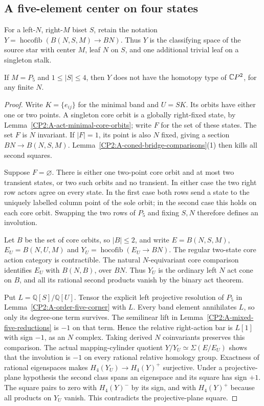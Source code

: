 \subsection{A five-element center on four states}

For a left-$N$, right-$M$ biset $S$, retain the notation
$Y=\operatorname{hocofib}(B(N,S,M)\to BN)$.  Thus $Y$ is
the classifying space of the source star with center $M$,
leaf $N$ on $S$, and one additional trivial leaf on a
singleton stalk.

\begin{lemma}
\label{CP2:A-coned-four-center-P5}
If $M=P_5$ and $1\le |S|\le4$, then $Y$ does not have
the homotopy type of $\mathbb{C}P^2$, for any finite $N$.
\end{lemma}
\begin{proof}
Write $K=\{e_{ij}\}$ for the minimal band and $U=SK$.
Its orbits have either one or two points.  A singleton
core orbit is a globally right-fixed state, by
Lemma~\ref{CP2:A-act-minimal-core-orbits}; write $F$ for
the set of these states.  The set $F$ is $N$ invariant.
If $|F|=1$, its point is also $N$ fixed, giving a section
$BN\to B(N,S,M)$.  Lemma~\ref{CP2:A-coned-bridge-comparisons}(1)
then kills all second squares.

Suppose $F=\varnothing$.  There is either one two-point
core orbit and at most two transient states, or two such
orbits and no transient.  In either case the two right
row actors agree on every state.  In the first case both
rows send a state to the uniquely labelled column point
of the sole orbit; in the second case this holds on each
core orbit.  Swapping the two rows of $P_5$ and fixing
$S,N$ therefore defines an involution.

Let $B$ be the set of core orbits, so $|B|\le2$, and
write $E=B(N,S,M)$, $E_U=B(N,U,M)$ and
$Y_U=\operatorname{hocofib}(E_U\to BN)$.  The regular
two-state core action category is contractible.  The
natural $N$-equivariant core comparison identifies $E_U$
with $B(N,B)$, over $BN$.  Thus $Y_U$ is the ordinary
left $N$ act cone on $B$, and all its rational second
products vanish by the binary act theorem.

Put $L=\mathbb Q[S]/\mathbb Q[U]$.  Tensor the explicit
left projective resolution of $P_5$ in
Lemma~\ref{CP2:A-order-five-corner} with $L$.  Every band
element annihilates $L$, so only its degree-one term
survives.  The semilinear lift in
Lemma~\ref{CP2:A-mixed-five-reductions} is $-1$ on that
term.  Hence the relative right-action bar is $L[1]$
with sign $-1$, as an $N$ complex.  Taking derived $N$
coinvariants preserves this comparison.  The actual
mapping-cylinder quotient $Y/Y_U\simeq\Sigma(E/E_U)$
shows that the involution is $-1$ on every rational
relative homology group.  Exactness of rational
eigenspaces makes $H_4(Y_U)\to H_4(Y)^+$ surjective.
Under a projective-plane hypothesis the second class
spans an eigenspace and its square has sign $+1$.
The square pairs to zero with $H_4(Y)^-$ by its sign,
and with $H_4(Y)^+$ because all products on $Y_U$ vanish.
This contradicts the projective-plane square.


\end{proof}
